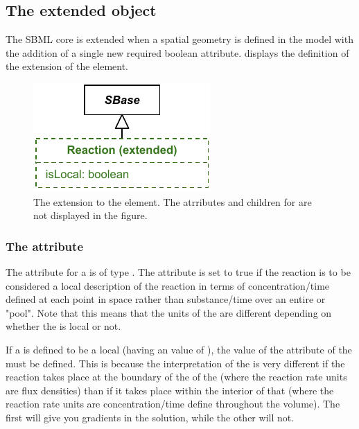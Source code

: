 \subsection{The extended \Reaction object}
\label{extended-reaction-class}
The SBML core \Reaction is extended when a spatial geometry is defined in the model with the addition of a single new required boolean  attribute.  displays the definition of the extension of the \Reaction element.
 
\begin{figure}[ht]
  \includegraphics{figs/extended-reaction-uml}
  \caption{The extension to the \Reaction element. The \sbmlthreecore atrributes and children for \Reaction are not displayed in the figure.}
  \label{reaction-uml}
\end{figure}

\subsubsection{The \fixttspace{} attribute}
The  attribute for a \Reaction is of type . The attribute is set to true if the reaction is to be considered a local description of the reaction in terms of concentration/time defined at each point in space rather than substance/time over an entire \Compartment or "pool".  Note that this means that the units of the \KineticLaw are different depending on whether the \Reaction is local or not.

If a \Reaction is defined to be a local (having an  value of ), the value of the  attribute of the \Reaction must be defined.  This is because the interpretation of the \Reaction is very different if the reaction takes place at the boundary of the \Compartment of the \Species (where the reaction rate units are flux densities) than if it takes place within the interior of that \Compartment (where the reaction rate units are concentration/time define throughout the volume).  The first will give you gradients in the solution, while the other will not.

